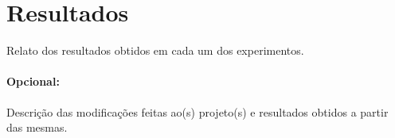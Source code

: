 \documentclass{article}
\begin{document}
\section{Resultados}

Relato dos resultados obtidos em cada um dos experimentos.

\paragraph{Opcional:} Descrição das modificações feitas ao(s) projeto(s) e resultados
obtidos a partir das mesmas.
 
\end{document}
